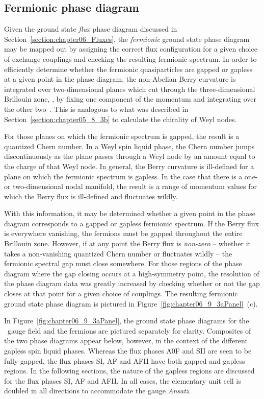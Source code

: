 \subsection{Fermionic phase diagram}
\label{section:chapter06_GaplessPhaseDiagram}
%
%
Given the ground state \textit{flux} phase diagram discussed in Section~\ref{section:chapter06_Fluxes}, the \textit{fermionic} ground state phase diagram may be mapped out by assigning the correct flux configuration for a given choice of exchange couplings and checking the resulting fermionic spectrum.
In order to efficiently determine whether the fermionic quasiparticles are gapped or gapless at a given point in the phase diagram, the non-Abelian Berry curvature is integrated over two-dimensional planes which cut through the three-dimensional Brillouin zone, \ie, by fixing one component of the momentum and integrating over the other two~\cite{FukuiJPS2005}.
This is analogous to what was described in Section~\ref{section:chapter05_8_3b} to calculate the chirality of Weyl nodes.

For those planes on which the fermionic spectrum is gapped, the result is a quantized Chern number.
In a Weyl spin liquid phase, the Chern number jumps discontinuously as the plane passes through a Weyl node by an amount equal to the charge of that Weyl node.
In general, the Berry curvature is ill-defined for a plane on which the fermionic spectrum is gapless.
In the case that there is a one- or two-dimensional nodal manifold, the result is a range of momentum values for which the Berry flux is ill-defined and fluctuates wildly.

With this information, it may be determined whether a given point in the phase diagram corresponds to a gapped or gapless fermionic spectrum.
If the Berry flux is everywhere vanishing, the fermions must be gapped throughout the entire Brillouin zone.
However, if at any point the Berry flux is \textit{non-zero} -- whether it takes a non-vanishing quantized Chern number or fluctuates wildly -- the fermionic spectral gap must close somewhere.
For those regions of the phase diagram where the gap closing occurs at a high-symmetry point, the resolution of the phase diagram data was greatly increased by checking whether or not the gap closes at that point for a given choice of couplings. 
The resulting fermionic ground state phase diagram is pictured in  Figure~\ref{fig:chapter06_9_3aPanel}~(c).

In Figure~\ref{fig:chapter06_9_3aPanel}, the ground state phase diagrams for the \ZZ~gauge field and the fermions are pictured separately for clarity.
Composites of the two phase diagrams appear below, however, in the context of the different gapless spin liquid phases.
Whereas the flux phases A0F and SII are seen to be fully gapped, the flux phases SI, AF and AFII have both gapped and gapless regions.
In the following sections, the nature of the gapless regions are discussed for the flux phases SI, AF and AFII.
In all cases, the elementary unit cell is doubled in all directions to accommodate the gauge \textit{Ansatz}.


